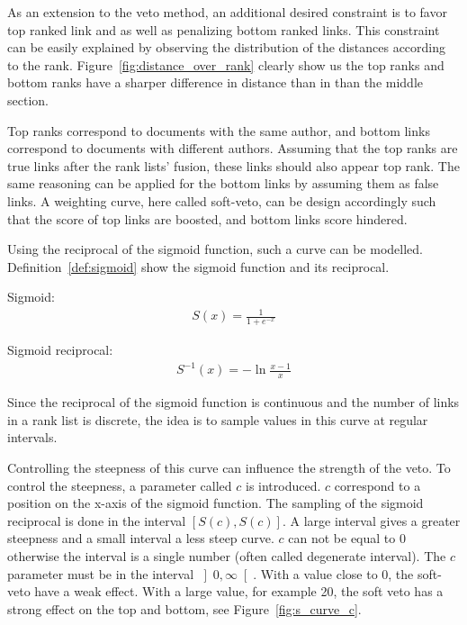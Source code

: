 As an extension to the veto method, an additional desired constraint is to favor top ranked link and as well as penalizing bottom ranked links.
This constraint can be easily explained by observing the distribution of the distances according to the rank.
Figure~\ref{fig:distance_over_rank} clearly show us the top ranks and bottom ranks have a sharper difference in distance than in than the middle section.

Top ranks correspond to documents with the same author, and bottom links correspond to documents with different authors.
Assuming that the top ranks are true links after the rank lists' fusion, these links should also appear top rank.
The same reasoning can be applied for the bottom links by assuming them as false links.
A weighting curve, here called soft-veto, can be design accordingly such that the score of top links are boosted, and bottom links score hindered.

Using the reciprocal of the sigmoid function, such a curve can be modelled.
Definition~\ref{def:sigmoid} show the sigmoid function and its reciprocal.

\begin{definition}
  Sigmoid:
  \begin{gather*}
    S(x) = \frac{1}{1+e^{-x}}
  \end{gather*}

  Sigmoid reciprocal:
  \begin{gather*}
    S^{-1}(x) = -\ln{\frac{x-1}{x}}
  \end{gather*}
\end{definition}

Since the reciprocal of the sigmoid function is continuous and the number of links in a rank list is discrete, the idea is to sample values in this curve at regular intervals.

Controlling the steepness of this curve can influence the strength of the veto.
To control the steepness, a parameter called $c$ is introduced.
$c$ correspond to a position on the x-axis of the sigmoid function.
The sampling of the sigmoid reciprocal is done in the interval $\left[S(c), S(c)\right]$.
A large interval gives a greater steepness and a small interval a less steep curve.
$c$ can not be equal to 0 otherwise the interval is a single number (often called degenerate interval).
The $c$ parameter must be in the interval $\left]0, \infty\right[$.
With a value close to $0$, the soft-veto have a weak effect.
With a large value, for example 20, the soft veto has a strong effect on the top and bottom, see Figure~\ref{fig:s_curve_c}.

